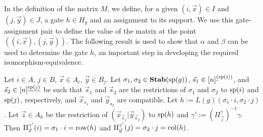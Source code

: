 \documentclass[../paper.tex]{subfiles}
\begin{document}
In the definition of the matrix $M$, we define, for a given $(i, \vec{x}) \in I$
and $(j, \vec{y}) \in J$, a gate $h \in H_g$ and an assignment to its support.
We use this gate-assignment pair to define the value of the matrix at the point
$((i, \vec{x}), (j, \vec{y}))$. The following result is used to show that
$\alpha$ and $\beta$ can be used to determine the gate $h$, an important step in
developing the required isomorphism-equivalence.

\begin{lem}
  \label{lem:defining-h-from-IJ}
  Let $i \in A$, $j \in B$, $\vec{x} \in A_i$, $\vec{y} \in B_j$. Let $\sigma_1,
  \sigma_2 \in \text{\textbf{Stab}} (\text{sp} (g))$, $\vec{s}_1 \in [n]^{\underline(\text{sp}(i))}$, and
  $\vec{s}_2 \in [n]^{\underline{\text{sp}(j)}}$ be such that $\vec{s}_1$ and
  $\vec{s}_2$ are the restrictions of $\sigma_1$ and $\sigma_2$ to $\text{sp}(i)$
  and $\text{sp}(j)$, respectively, and $\vec{x}_{s_1}$ and $\vec{y}_{s_2}$ are
  compatible. Let $h := L(g)(\sigma_1 \cdot i, \sigma_2 \cdot j)$. Let $\vec{z}
  \in A_h$ be the restriction of $(\vec{x}_{\vec{s}_1} \vert
  \vec{y}_{\vec{s}_2})$ to $\text{sp}(h)$ and $\gamma' :=
  (\Pi^{\gamma}_{\vec{z}})^{-1} \gamma$. Then $\Pi^{\gamma'}_{\vec{x}}(i) =
  \sigma_1 \cdot i = \text{row} (h)$ and $\Pi^{\gamma'}_{\vec{y}}(j) = \sigma_2 \cdot
  j = \text{col} (h)$.
\end{lem}
\end{document}
